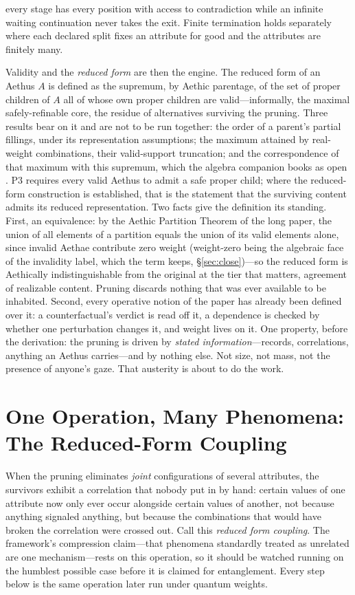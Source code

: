 \documentclass[11pt]{article}
\theoremstyle{definition}
\newcommand{\Aethus}{Aethus}
\begin{document}
every stage has every position with access to contradiction while an infinite waiting continuation never takes the exit. Finite termination holds separately where each declared split fixes an attribute for good and the attributes are finitely many.

Validity and the \emph{reduced form} are then the engine. The reduced form of an \Aethus{} $A$ is defined as the supremum, by Aethic parentage, of the set of proper children of $A$ all of whose own proper children are valid---informally, the maximal safely-refinable core, the residue of alternatives surviving the pruning. Three results bear on it and are not to be run together: the order of a parent's partial fillings, under its representation assumptions; the maximum attained by real-weight combinations, their valid-support truncation; and the correspondence of that maximum with this supremum, which the algebra companion books as open \cite{AethusTree}. P3 requires every valid \Aethus{} to admit a safe proper child; where the reduced-form construction is established, that is the statement that the surviving content admits its reduced representation. Two facts give the definition its standing. First, an equivalence: by the Aethic Partition Theorem of the long paper, the union of all elements of a partition equals the union of its valid elements alone, since invalid Aethae contribute zero weight (weight-zero being the algebraic face of the invalidity label, which the term keeps, \S\ref{sec:close})---so the reduced form is Aethically indistinguishable from the original at the tier that matters, agreement of realizable content. Pruning discards nothing that was ever available to be inhabited. Second, every operative notion of the paper has already been defined over it: a counterfactual's verdict is read off it, a dependence is checked by whether one perturbation changes it, and weight lives on it. One property, before the derivation: the pruning is driven by \emph{stated information}---records, correlations, anything an \Aethus{} carries---and by nothing else. Not size, not mass, not the presence of anyone's gaze. That austerity is about to do the work.

\section{One Operation, Many Phenomena: The Reduced-Form Coupling}\label{sec:coupling}

When the pruning eliminates \emph{joint} configurations of several attributes, the survivors exhibit a correlation that nobody put in by hand: certain values of one attribute now only ever occur alongside certain values of another, not because anything signaled anything, but because the combinations that would have broken the correlation were crossed out. Call this \emph{reduced form coupling}. The framework's compression claim---that phenomena standardly treated as unrelated are one mechanism---rests on this operation, so it should be watched running on the humblest possible case before it is claimed for entanglement. Every step below is the same operation later run under quantum weights.
\end{document}
